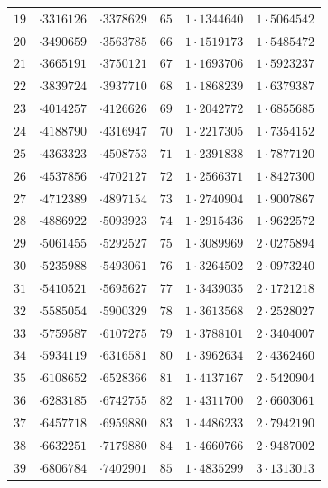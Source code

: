 \documentclass[11pt]{article}
\begin{document}
\begin{center}
\begin{tabular}{|r|r|r||r|r|r|}
$19$ & $\cdot 3316126$ & $\cdot 3378629$ & $65$ & $1\cdot 1344640$ & $1\cdot 5064542$ \\
$20$ & $\cdot 3490659$ & $\cdot 3563785$ & $66$ & $1\cdot 1519173$ & $1\cdot 5485472$ \\
$21$ & $\cdot 3665191$ & $\cdot 3750121$ & $67$ & $1\cdot 1693706$ & $1\cdot 5923237$ \\
$22$ & $\cdot 3839724$ & $\cdot 3937710$ & $68$ & $1\cdot 1868239$ & $1\cdot 6379387$ \\
$23$ & $\cdot 4014257$ & $\cdot 4126626$ & $69$ & $1\cdot 2042772$ & $1\cdot 6855685$ \\
$24$ & $\cdot 4188790$ & $\cdot 4316947$ & $70$ & $1\cdot 2217305$ & $1\cdot 7354152$ \\
$25$ & $\cdot 4363323$ & $\cdot 4508753$ & $71$ & $1\cdot 2391838$ & $1\cdot 7877120$ \\
$26$ & $\cdot 4537856$ & $\cdot 4702127$ & $72$ & $1\cdot 2566371$ & $1\cdot 8427300$ \\
$27$ & $\cdot 4712389$ & $\cdot 4897154$ & $73$ & $1\cdot 2740904$ & $1\cdot 9007867$ \\
$28$ & $\cdot 4886922$ & $\cdot 5093923$ & $74$ & $1\cdot 2915436$ & $1\cdot 9622572$ \\
$29$ & $\cdot 5061455$ & $\cdot 5292527$ & $75$ & $1\cdot 3089969$ & $2\cdot 0275894$ \\
$30$ & $\cdot 5235988$ & $\cdot 5493061$ & $76$ & $1\cdot 3264502$ & $2\cdot 0973240$ \\
$31$ & $\cdot 5410521$ & $\cdot 5695627$ & $77$ & $1\cdot 3439035$ & $2\cdot 1721218$ \\
$32$ & $\cdot 5585054$ & $\cdot 5900329$ & $78$ & $1\cdot 3613568$ & $2\cdot 2528027$ \\
$33$ & $\cdot 5759587$ & $\cdot 6107275$ & $79$ & $1\cdot 3788101$ & $2\cdot 3404007$ \\
$34$ & $\cdot 5934119$ & $\cdot 6316581$ & $80$ & $1\cdot 3962634$ & $2\cdot 4362460$ \\
$35$ & $\cdot 6108652$ & $\cdot 6528366$ & $81$ & $1\cdot 4137167$ & $2\cdot 5420904$ \\
$36$ & $\cdot 6283185$ & $\cdot 6742755$ & $82$ & $1\cdot 4311700$ & $2\cdot 6603061$ \\
$37$ & $\cdot 6457718$ & $\cdot 6959880$ & $83$ & $1\cdot 4486233$ & $2\cdot 7942190$ \\
$38$ & $\cdot 6632251$ & $\cdot 7179880$ & $84$ & $1\cdot 4660766$ & $2\cdot 9487002$ \\
$39$ & $\cdot 6806784$ & $\cdot 7402901$ & $85$ & $1\cdot 4835299$ & $3\cdot 1313013$ \\

\end{tabular}
\end{center}
\end{document}
